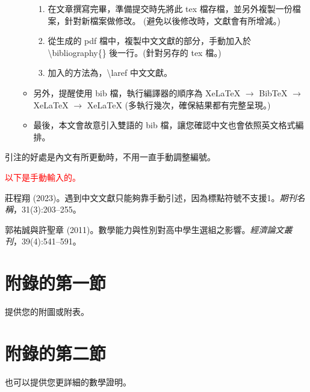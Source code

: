 \documentclass[utf8,12pt]{article} %
\begin{document}
\begin{spacing}{1.5}
\begin{itemize}
\begin{itemize}
\begin{enumerate}[1]
			\item 在文章撰寫完畢，準備提交時先將此 tex 檔存檔，並另外複製一份檔案，針對新檔案做修改。 (避免以後修改時，文獻會有所增減。)
			\item 從生成的 pdf 檔中，複製中文文獻的部分，手動加入於 \textbackslash bibliography\{\} 後一行。(針對另存的 tex 檔。)
			\item 加入的方法為，\textbackslash laref 中文文獻。
		\end{enumerate}
		\item 另外，提醒使用 bib 檔，執行編譯器的順序為 XeLaTeX $\rightarrow$ BibTeX $\rightarrow$ XeLaTeX  $\rightarrow$ XeLaTeX (多執行幾次，確保結果都有完整呈現。)
		\item 最後，本文會故意引入雙語的 bib 檔，讓您確認中文也會依照英文格式編排。
	\end{itemize}	
\end{itemize}

引注的好處是內文有所更動時，不用一直手動調整編號。
%
\end{spacing}
%
%


%
\laref \textcolor{red}{以下是手動輸入的。}\par
\laref 莊程翔 (2023)。遇到中文文獻只能夠靠手動引述，因為標點符號不支援1。\emph{期刊名稱}，31(3):203--255。\par
\laref 郭祐誠與許聖章 (2011)。數學能力與性別對高中學生選組之影響。\emph{經濟論文叢刊}，39(4):541–591。
%
%
\appendix
\appendixpage
\section{附錄的第一節}
%
\begin{spacing}{1.5}
%
	提供您的附圖或附表。
%
\end{spacing}
%
\section{附錄的第二節}
%
\begin{spacing}{1.5}
%
	也可以提供您更詳細的數學證明。
%
\end{spacing}
%
\end{document}
